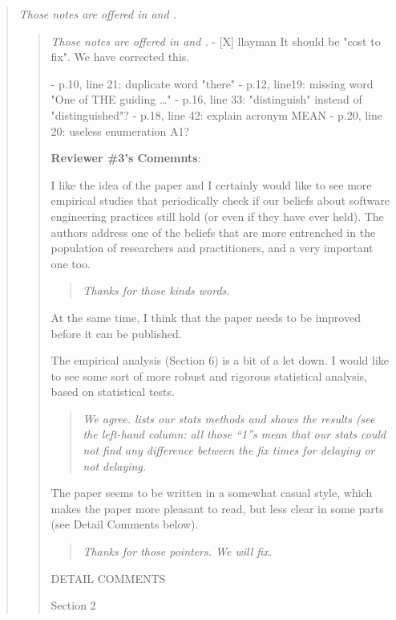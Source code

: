 \begin{quote}{\em 
Those notes are offered in  and .}
\begin{quote}{\em 
Those notes are offered in  and .}
- [X]  llayman It should be "cost to fix". We have corrected this.

 
- p.10, line 21: duplicate word "there" -
p.12, line19: missing word "One of THE guiding …" - p.16,
line 33: "distinguish" instead of "distinguished"?  - p.18,
line 42: explain acronym MEAN - p.20, line 20: useless
enumeration A1?
 

{\bf  Reviewer \#3's Comemnts}: 

I like the idea of the paper and I certainly
would like to see more empirical studies that periodically
check if our beliefs about software engineering practices
still hold (or even if they have ever held). The authors
address one of the beliefs that are more entrenched in the
population of researchers and practitioners, and a very
important one too.


\begin{quote}{\em
Thanks for those kinds words.
 }\end{quote}

At the same time, I think that the paper needs to be
improved before it can be published.

The empirical analysis (Section 6) is a bit of a let down. I
would like to see some sort of more robust and rigorous
statistical analysis, based on statistical tests.



\begin{quote}{\em
We agree.  lists our stats methods and 
shows the results (see the left-hand column: all those ``1''s mean
that our stats could not find any difference between the fix times for
delaying or not delaying.
 }\end{quote}
 
 
The paper seems to be written in a somewhat casual style,
which makes the paper more pleasant to read, but less clear
in some parts (see Detail Comments below).

\begin{quote}{\em
Thanks for those pointers. We will fix.
 }\end{quote}

DETAIL COMMENTS

Section 2


\end{quote}
\end{quote}
